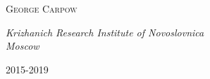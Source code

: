 \begin{titlepage}
	\vspace{0.5\baselineskip} %
	
	{\scshape\Large George Carpow \\} %
	
	\vspace{0.5\baselineskip} %
	
	\textit{Krizhanich Research Institute of Novoslovnica \\ Moscow} %
	
	\vfill %
	
	
	\plogo %
	
	\vspace{0.3\baselineskip} %
	
	2015-2019 %
	
	
\end{titlepage}



